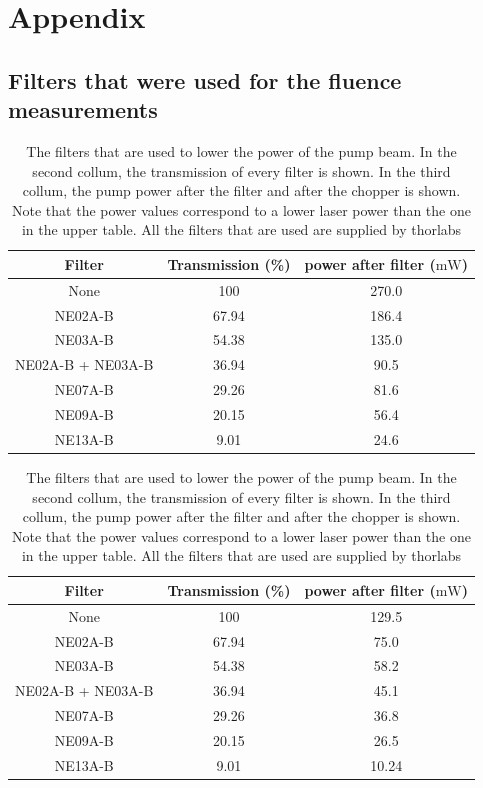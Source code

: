 \chapter{Appendix}
\label{sec:appendix}
\section{Filters that were used for the fluence measurements}
\begin{table}
    \centering
    \begin{tabular}{ccc}
        \toprule
        Filter & Transmission (\%)  & power after filter ($\si{\milli\watt}$) \\
        \midrule
        None & 100 & 270.0 \\
        NE02A-B & 67.94 &  186.4 \\
        NE03A-B & 54.38 & 135.0  \\
        NE02A-B + NE03A-B & 36.94 & 90.5 \\
        NE07A-B & 29.26 & 81.6 \\
        NE09A-B & 20.15 & 56.4 \\
        NE13A-B & 9.01 & 24.6 \\
        \bottomrule
    \end{tabular} 
    \caption{The filters that are used to lower the power of the pump beam. In the second collum, the transmission of every filter is shown. In the third collum, the pump power after the filter and after the chopper is shown.
    Note that the power values correspond to the highest laser power that is available with the given setup. Measurements with lower initial laser power are also taken. All the filters that are used were bought from Thorlabs \cite{thorlabs}.}
    \begin{tabular}{ccc}
        \toprule
        Filter & Transmission (\%)  & power after filter ($\si{\milli\watt}$) \\
        \midrule
        None & 100 & 129.5 \\
        NE02A-B & 67.94 &  75.0 \\
        NE03A-B & 54.38 & 58.2  \\
        NE02A-B + NE03A-B & 36.94 & 45.1 \\
        NE07A-B & 29.26 & 36.8 \\
        NE09A-B & 20.15 & 26.5 \\
        NE13A-B & 9.01 & 10.24\\
        \bottomrule
    \end{tabular} 
    \caption{The filters that are used to lower the power of the pump beam. In the second collum, the transmission of every filter is shown. In the third collum, the pump power after the filter and after the chopper is shown.
    Note that the power values correspond to a lower laser power than the one in the upper table. All the filters that are used are supplied by thorlabs \cite{thorlabs}}
    \label{tab:filters}
\end{table}

